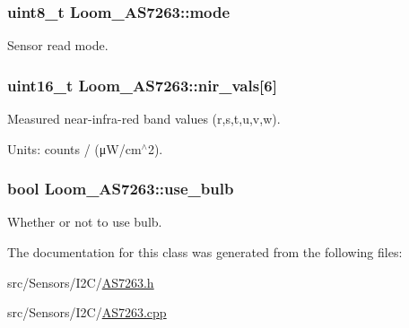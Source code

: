 \subsubsection[{\texorpdfstring{mode}{mode}}]{\setlength{\rightskip}{0pt plus 5cm}uint8\+\_\+t Loom\+\_\+\+A\+S7263\+::mode\hspace{0.3cm}{\ttfamily [protected]}}\hypertarget{class_loom___a_s7263_a3474bf1e38b6513f517f3e364d96df36}{}\label{class_loom___a_s7263_a3474bf1e38b6513f517f3e364d96df36}


Sensor read mode. 

\subsubsection[{\texorpdfstring{nir\+\_\+vals}{nir_vals}}]{\setlength{\rightskip}{0pt plus 5cm}uint16\+\_\+t Loom\+\_\+\+A\+S7263\+::nir\+\_\+vals\mbox{[}6\mbox{]}\hspace{0.3cm}{\ttfamily [protected]}}\hypertarget{class_loom___a_s7263_a3d2e672d1bb20a793e3b0cde44fac99e}{}\label{class_loom___a_s7263_a3d2e672d1bb20a793e3b0cde44fac99e}


Measured near-\/infra-\/red band values (r,s,t,u,v,w). 

Units\+: counts / (μ\+W/cm$^\wedge$2). 
\subsubsection[{\texorpdfstring{use\+\_\+bulb}{use_bulb}}]{\setlength{\rightskip}{0pt plus 5cm}bool Loom\+\_\+\+A\+S7263\+::use\+\_\+bulb\hspace{0.3cm}{\ttfamily [protected]}}\hypertarget{class_loom___a_s7263_a58d52744648dd8354bc875f48ef4639a}{}\label{class_loom___a_s7263_a58d52744648dd8354bc875f48ef4639a}


Whether or not to use bulb. 



The documentation for this class was generated from the following files\+:\begin{DoxyCompactItemize}
\item 
src/\+Sensors/\+I2\+C/\hyperlink{_a_s7263_8h}{A\+S7263.\+h}\item 
src/\+Sensors/\+I2\+C/\hyperlink{_a_s7263_8cpp}{A\+S7263.\+cpp}\end{DoxyCompactItemize}
